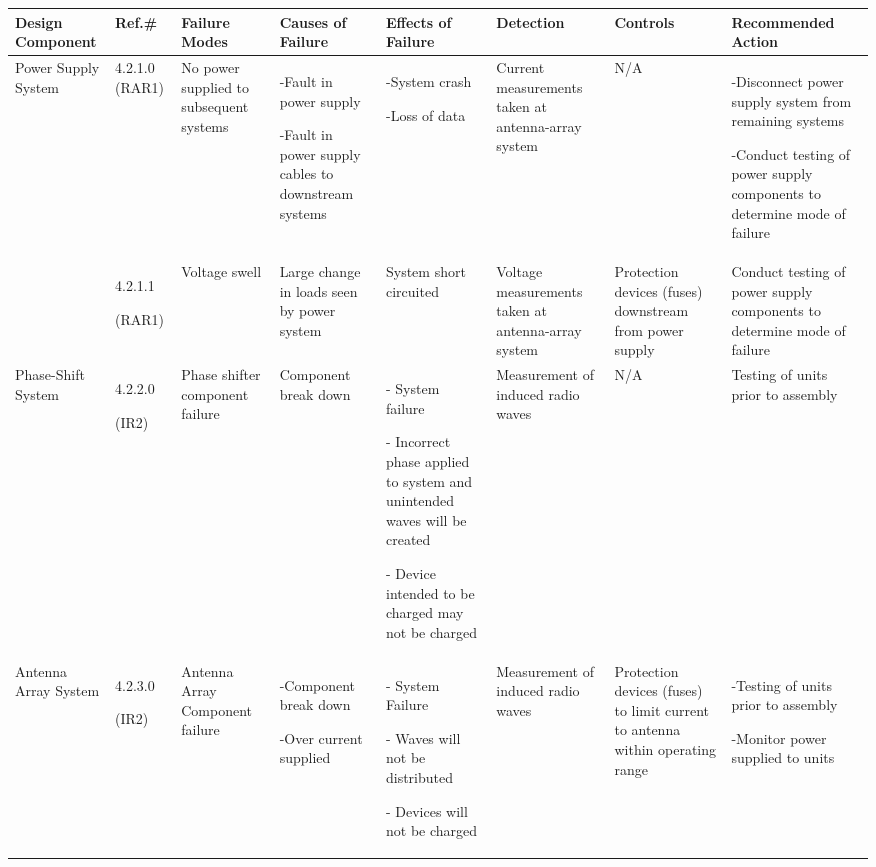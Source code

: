 \documentclass[12pt, titlepage]{article}
\begin{document}
\begin{center}
\begin{adjustwidth}{-3.5cm}{}
\begin{tabular}{|p{1.6cm}|p{1.2cm}|p{1.6cm}|p{2.4cm}|p{2cm}|p{2.2cm}|p{2cm}|p{4.5cm}|}
\hline
Design Component & Ref.\# & Failure Modes & Causes of Failure & Effects of Failure & Detection & Controls & Recommended Action\\
\hline
Power Supply System & 4.2.1.0 (RAR1)& No power supplied to subsequent systems & -Fault in power supply \par -Fault in power supply cables to downstream systems & -System crash \par -Loss of data & Current measurements taken at antenna-array system & N/A & -Disconnect power supply system from remaining systems \par -Conduct testing of power supply components to determine mode of failure \par\\

& 4.2.1.1\par (RAR1) & Voltage swell & Large change in loads seen by power system & System short circuited & Voltage measurements taken at antenna-array system & Protection devices (fuses) downstream from power supply & Conduct testing of power supply components to determine mode of failure\\
\hline
Phase-Shift System & 4.2.2.0 \par (IR2) & Phase shifter component failure & Component break down & - System failure \par - Incorrect phase applied to system and unintended waves will be created \par - Device intended to be charged may not be charged & Measurement of induced radio waves & N/A & Testing of units prior to assembly\\
\hline
Antenna Array System & 4.2.3.0 \par (IR2) & Antenna Array Component failure & -Component break down \par -Over current supplied & - System Failure \par - Waves will not be distributed \par - Devices will not be charged & Measurement of induced radio waves & Protection devices (fuses) to limit current to antenna within operating range & -Testing of units prior to assembly \par -Monitor power supplied to units\\
\hline
\end{tabular}
\end{adjustwidth}
\end{center}
\end{document}
